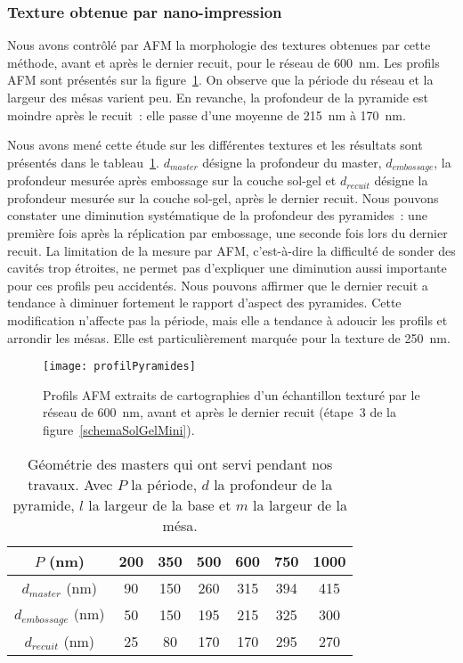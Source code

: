 	\subsubsection{Texture obtenue par nano-impression}
Nous avons contrôlé par AFM la morphologie des textures obtenues par cette méthode, avant et après le dernier recuit, pour le réseau de 600~nm. Les profils AFM sont présentés sur la figure~\ref{profilPyramides}. On observe que la période du réseau et la largeur des mésas varient peu. En revanche, la profondeur de la pyramide est moindre après le recuit~: elle passe d’une moyenne de 215~nm à 170~nm.\par 
Nous avons mené cette étude sur les différentes textures et les résultats sont présentés dans le tableau~\ref{tPerteRecuit}. $d_{master}$ désigne la profondeur du master, $d_{embossage}$, la profondeur mesurée après embossage sur la couche sol-gel et $d_{recuit}$ désigne la profondeur mesurée sur la couche sol-gel, après le dernier recuit. Nous pouvons constater une diminution systématique de la profondeur des pyramides~: une première fois après la réplication par embossage, une seconde fois lors du dernier recuit. La limitation de la mesure par AFM, c’est-à-dire la difficulté de sonder des cavités trop étroites, ne permet pas d’expliquer une diminution aussi importante pour ces profils peu accidentés. Nous pouvons affirmer que le dernier recuit a tendance à diminuer fortement le rapport d’aspect des pyramides. Cette modification n’affecte pas la période, mais elle a tendance à adoucir les profils et arrondir les mésas. Elle est particulièrement marquée pour la texture de 250~nm.\par 
\begin{figure}[!htb]
\centering
\texttt{[image: profilPyramides]}
\caption{Profils AFM extraits de cartographies d’un échantillon texturé par le réseau de 600~nm, avant et après le dernier recuit (étape~3 de la figure~\ref{schemaSolGelMini}).}
\label{profilPyramides}
\end{figure}
\begin{table}[!htb]
\centering
\begin{tabular}{ccccccc}
\hline
$P$ (nm) & 200 & 350 & 500 & 600 & 750 & 1000\\
\hline
$d_{master}$ (nm) & 90 & 150 & 260 & 315 & 394 & 415\\
$d_{embossage}$ (nm) & 50 & 150 & 195 & 215 & 325 & 300\\
$d_{recuit}$ (nm) & 25 & 80 & 170 & 170 & 295 & 270\\
\hline
\end{tabular}
\caption{Géométrie des masters qui ont servi pendant nos travaux. Avec $P$ la période, $d$ la profondeur de la pyramide, $l$ la largeur de la base et $m$ la largeur de la mésa.}
\label{tPerteRecuit}
\end{table}
